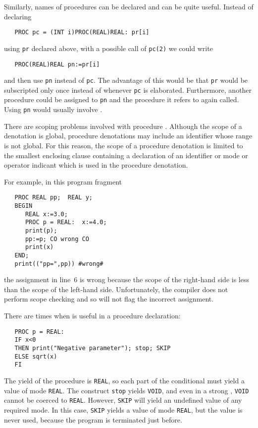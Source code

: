 Similarly, names of procedures can be declared and can be quite
useful.  Instead of declaring
\begin{verbatim}
   PROC pc = (INT i)PROC(REAL)REAL: pr[i]
\end{verbatim}
\noindent
using \verb|pr| declared above, with a possible call of \verb|pc(2)|
we could write
\begin{verbatim}
   PROC(REAL)REAL pn:=pr[i]
\end{verbatim}
\noindent
and then use \verb|pn| instead of \verb|pc|. The advantage of this
would be that \verb|pr| would be subscripted only once instead of
whenever \verb|pc| is elaborated. Furthermore, another procedure
could be assigned to \verb|pn| and the procedure it refers to again
called.  Using \verb|pn| would usually involve
.

There are scoping problems involved with procedure
. Although the scope of a denotation is
global, procedure denotations may include an identifier whose range
is not global. For this reason, the scope of a procedure denotation
is limited to the smallest enclosing clause containing a declaration
of an identifier or mode or operator indicant which is used in the
procedure denotation.

For example, in this program fragment
\begin{verbatim}
   PROC REAL pp;  REAL y;
   BEGIN
      REAL x:=3.0;
      PROC p = REAL:  x:=4.0;
      print(p);
      pp:=p; CO wrong CO
      print(x)
   END;
   print(("pp=",pp)) #wrong#
\end{verbatim}
\noindent
the assignment in line~6 is wrong because the scope of the right-hand
side is less than the scope of the left-hand side. Unfortunately, the
 compiler does not perform scope
checking and so will not flag the incorrect assignment.

There are times when  is useful in a procedure declaration:
\begin{verbatim}
   PROC p = REAL:
   IF x<0
   THEN print("Negative parameter"); stop; SKIP
   ELSE sqrt(x)
   FI
\end{verbatim}
\noindent
The yield of the procedure is \verb|REAL|, so each part of the
conditional  must yield a value of
mode \verb|REAL|.  The construct \verb|stop| yields \verb|VOID|, and
even in a strong , \verb|VOID| cannot be
coerced to \verb|REAL|.  However, \verb|SKIP| will yield an undefined
value of any required mode.  In this case, \verb|SKIP| yields a value
of mode \verb|REAL|, but the value is never used, because the program
is terminated just before.

